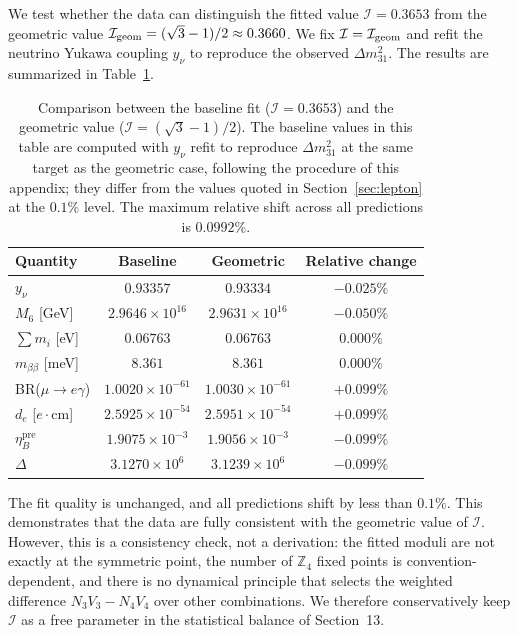 \documentclass[12pt,a4paper]{article}
\numberwithin{equation}{section}
\begin{document}
We test whether the data can distinguish the fitted value \(\mathcal I = 0.3653\) from the geometric value \(\mathcal I_{\rm geom} = (\sqrt{3}-1)/2 \approx 0.3660\). We fix \(\mathcal I = \mathcal I_{\rm geom}\) and refit the neutrino Yukawa coupling \(y_\nu\) to reproduce the observed \(\Delta m^2_{31}\). The results are summarized in Table~\ref{tab:I_check}.

\begin{table}[H]
\centering
\caption{Comparison between the baseline fit (\(\mathcal I = 0.3653\)) and the geometric value (\(\mathcal I = (\sqrt{3}-1)/2\)). The baseline values in this table are computed with \(y_\nu\) refit to reproduce \(\Delta m^2_{31}\) at the same target as the geometric case, following the procedure of this appendix; they differ from the values quoted in Section~\ref{sec:lepton} at the \(0.1\%\) level. The maximum relative shift across all predictions is \(0.0992\%\).}
\label{tab:I_check}
\begin{tabular}{lccc}
\toprule
Quantity & Baseline & Geometric & Relative change \\
\midrule
\(y_\nu\) & \(0.93357\) & \(0.93334\) & \(-0.025\%\) \\
\(M_6\) [GeV] & \(2.9646\times 10^{16}\) & \(2.9631\times 10^{16}\) & \(-0.050\%\) \\
\(\sum m_i\) [eV] & \(0.06763\) & \(0.06763\) & \(0.000\%\) \\
\(m_{\beta\beta}\) [meV] & \(8.361\) & \(8.361\) & \(0.000\%\) \\
BR(\(\mu\to e\gamma\)) & \(1.0020\times 10^{-61}\) & \(1.0030\times 10^{-61}\) & \(+0.099\%\) \\
\(d_e\) [\(e\cdot\mathrm{cm}\)] & \(2.5925\times 10^{-54}\) & \(2.5951\times 10^{-54}\) & \(+0.099\%\) \\
\(\eta_B^{\mathrm{pre}}\) & \(1.9075\times 10^{-3}\) & \(1.9056\times 10^{-3}\) & \(-0.099\%\) \\
\(\Delta\) & \(3.1270\times 10^6\) & \(3.1239\times 10^6\) & \(-0.099\%\) \\
\bottomrule
\end{tabular}
\end{table}

The fit quality is unchanged, and all predictions shift by less than \(0.1\%\). This demonstrates that the data are fully consistent with the geometric value of \(\mathcal I\). However, this is a consistency check, not a derivation: the fitted moduli are not exactly at the symmetric point, the number of \(\mathbb Z_4\) fixed points is convention-dependent, and there is no dynamical principle that selects the weighted difference \(N_3 V_3 - N_4 V_4\) over other combinations. We therefore conservatively keep \(\mathcal I\) as a free parameter in the statistical balance of Section~13.
\end{document}
